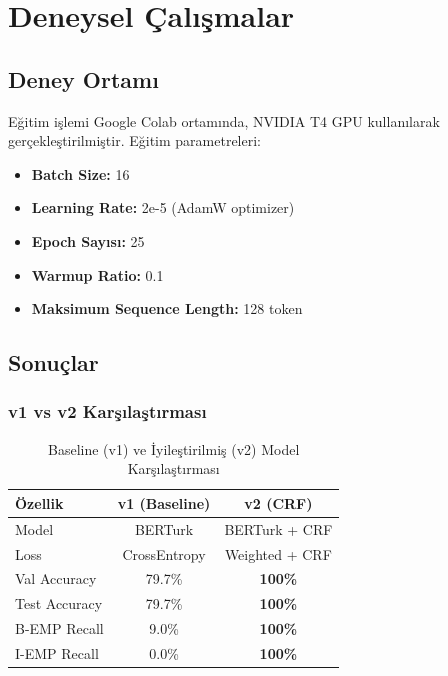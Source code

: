 \documentclass[conference]{IEEEtran}
\begin{document}
\section{Deneysel Çalışmalar}

\subsection{Deney Ortamı}
Eğitim işlemi Google Colab ortamında, NVIDIA T4 GPU kullanılarak gerçekleştirilmiştir. Eğitim parametreleri:
\begin{itemize}
    \item \textbf{Batch Size:} 16
    \item \textbf{Learning Rate:} 2e-5 (AdamW optimizer)
    \item \textbf{Epoch Sayısı:} 25
    \item \textbf{Warmup Ratio:} 0.1
    \item \textbf{Maksimum Sequence Length:} 128 token
\end{itemize}

\subsection{Sonuçlar}

\subsubsection{v1 vs v2 Karşılaştırması}
\begin{table}[htbp]
\caption{Baseline (v1) ve İyileştirilmiş (v2) Model Karşılaştırması}
\begin{center}
\begin{tabular}{|l|c|c|}
\hline
\textbf{Özellik} & \textbf{v1 (Baseline)} & \textbf{v2 (CRF)} \\
\hline
Model & BERTurk & BERTurk + CRF \\
\hline
Loss & CrossEntropy & Weighted + CRF \\
\hline
Val Accuracy & 79.7\% & \textbf{100\%} \\
\hline
Test Accuracy & 79.7\% & \textbf{100\%} \\
\hline
B-EMP Recall & 9.0\% & \textbf{100\%} \\
\hline
I-EMP Recall & 0.0\% & \textbf{100\%} \\
\hline
\end{tabular}
\label{tab1}
\end{center}
\end{table}
\end{document}
